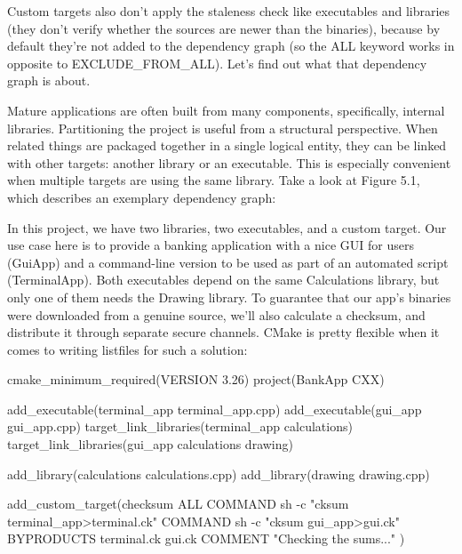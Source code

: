 Custom targets also don’t apply the staleness check like executables and libraries (they don’t verify whether the sources are newer than the binaries), because by default they’re not added to the dependency graph (so the ALL keyword works in opposite to EXCLUDE\_FROM\_ALL). Let’s find out what that dependency graph is about.


Mature applications are often built from many components, specifically, internal libraries. Partitioning the project is useful from a structural perspective. When related things are packaged together in a single logical entity, they can be linked with other targets: another library or an executable. This is especially convenient when multiple targets are using the same library. Take a look at Figure 5.1, which describes an exemplary dependency graph:


In this project, we have two libraries, two executables, and a custom target. Our use case here is to provide a banking application with a nice GUI for users (GuiApp) and a command-line version to be used as part of an automated script (TerminalApp). Both executables depend on the same Calculations library, but only one of them needs the Drawing library. To guarantee that our app’s binaries were downloaded from a genuine source, we’ll also calculate a checksum, and distribute it through separate secure channels. CMake is pretty flexible when it comes to writing listfiles for such a solution:


\begin{cmake}
cmake_minimum_required(VERSION 3.26)
project(BankApp CXX)

add_executable(terminal_app terminal_app.cpp)
add_executable(gui_app gui_app.cpp)
target_link_libraries(terminal_app calculations)
target_link_libraries(gui_app calculations drawing)

add_library(calculations calculations.cpp)
add_library(drawing drawing.cpp)

add_custom_target(checksum ALL
    COMMAND sh -c "cksum terminal_app>terminal.ck"
    COMMAND sh -c "cksum gui_app>gui.ck"
    BYPRODUCTS terminal.ck gui.ck
    COMMENT "Checking the sums..."
)
\end{cmake}

